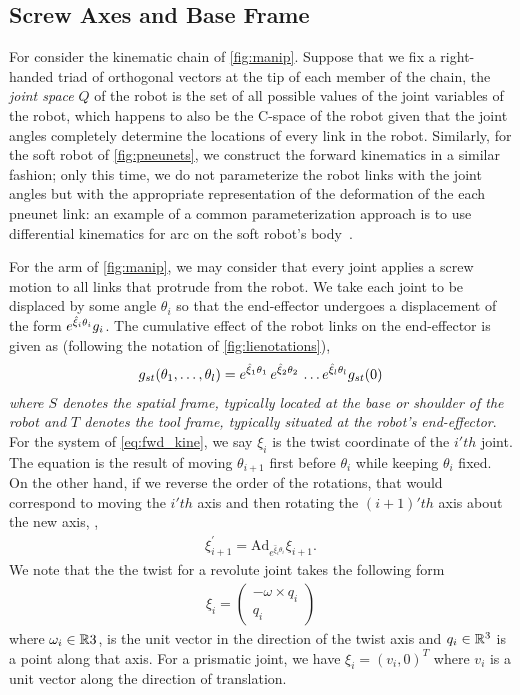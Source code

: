 \subsection{Screw Axes and  Base Frame}

For consider the kinematic chain of \autoref{fig:manip}. Suppose that we fix a right-handed triad of orthogonal vectors at the tip of each member of the chain, the\textit{ joint space} $Q$ of the robot is the set of all possible values of the joint variables of the robot, which happens to also be the C-space of the robot given that the joint angles completely determine the locations of every link in the robot. 
Similarly, for the soft robot of \autoref{fig:pneunets}, we construct the forward kinematics in a similar fashion; only this time, we do not parameterize the robot links with the joint angles but with the appropriate representation of the deformation of the each pneunet link: an example of a common parameterization approach is to use differential kinematics for arc on the soft robot's body~\cite{Hannan2003}.

For the arm of \autoref{fig:manip}, we may consider that every joint applies a screw motion to all links that protrude from the robot. We take each joint to be displaced by some angle $\theta_i$ so that the end-effector undergoes a displacement of the form $e^{\hat{\xi}_i \theta_i}g_i$. The cumulative effect of the robot links on the end-effector is given as (following the notation of \autoref{fig:lienotations}),
%
\begin{align}
g_{st}(\theta_1, \ldots, \theta_l) = e^{\hat{\xi}_1 \theta_1}\,e^{\hat{\xi}_2 \theta_2}  \, \ldots e^{\hat{\xi}_l \theta_l} g_{st}(0)
\label{eq:fwd_kine}
\end{align}
%
\textit{where $S$ denotes the spatial frame, typically located at the base or shoulder of the robot and $T$ denotes the tool frame, typically situated at the robot's end-effector}. For the system of \eqref{eq:fwd_kine}, we say $\xi_i$ is the twist coordinate of the $i'th$ joint. The equation is the result of moving $\theta_{i+1}$ first before $\theta_i$ while keeping $\theta_i$ fixed. On the other hand, if we reverse the order of the rotations, that would correspond to moving the $i'th$ axis and then rotating the $(i+1)'th$ axis about the new axis, \ie,
%
\begin{align}
	\xi_{i+1}^\prime = \text{Ad}_{e^{\hat{\xi}_i \theta_i}} \xi_{i+1}.
\end{align}
%
We note that the the twist for a revolute joint takes the following form
%
\begin{align}
	\xi_i = \left(\begin{array}{c}
	-\omega \times q_i \\ q_i
	\end{array}\right)
\end{align}
%
where $\omega_i \in \mathbb{R}3$, is the unit vector in the direction of the twist axis and $q_i \in \mathbb{R}^3$ is a point along that axis. For a prismatic joint, we have $\xi_i = (v_i, 0)^T$ where $v_i$ is a unit vector along the direction of translation.

